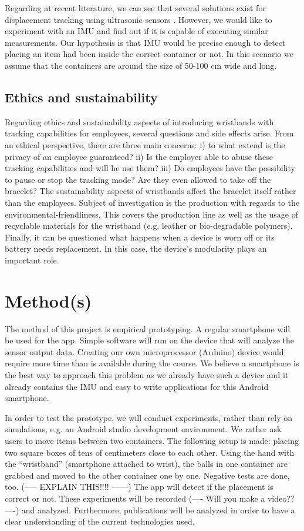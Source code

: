 \documentclass[12pt,twoside, hidelinks]{article}
\begin{document}
Regarding at recent literature, we can see that several solutions exist for displacement tracking using ultrasonic sensors \cite{QiYongbin2014Awwu}. However, we would like to experiment with an IMU and find out if it is capable of executing similar measurements. 
Our hypothesis is that IMU would be precise enough to detect placing an item had been inside the correct container or not. In this scenario we assume that the containers are around the size of 50-100 cm wide and long.

\subsection{Ethics and sustainability}
\label{sect:ethics}

Regarding ethics and sustainability aspects of introducing wristbands with tracking capabilities for employees, several questions and side effects arise. From an ethical perspective, there are three main concerns: i) to what extend is the privacy of an employee guaranteed? ii) Is the employer able to abuse these tracking capabilities and will he use them? iii) Do employees have the possibility to pause or stop the tracking mode? Are they even allowed to take off the bracelet?
The sustainability aspects of wristbands affect the bracelet itself rather than the employees. Subject of investigation is the production with regards to the environmental-friendliness. This covers the production line as well as the usage of recyclable materials for the wristband (e.g. leather or bio-degradable polymers). Finally, it can be questioned what happens when a device is worn off or its battery needs replacement. In this case, the device's modularity plays an important role.

\section{Method(s)}
\label{sec:method}


The method of this project is empirical prototyping. A regular smartphone will be used for the app. Simple software will run on the device that will analyze the sensor output data. Creating our own microprocessor (Arduino) device would require more time than is available during the course. We believe a smartphone is the best way to approach this problem as we already have such a device and it already contains the IMU and easy to write applications for this Android smartphone.

In order to test the prototype, we will conduct experiments, rather than rely on simulations, e.g. an Android studio development environment. We rather ask users to move items between two containers. The following setup is made: placing two square boxes of tens of centimeters close to each other. Using the hand with the “wristband” (smartphone attached to wrist), the balls in one container are grabbed and moved to the other container one by one. Negative tests are done, too. (----- EXPLAIN THIS!!!! ------) The app will detect if the placement is correct or not. These experiments will be recorded (---- Will you make a video?? ----) and analyzed.
Furthermore, publications will be analyzed in order to have a clear understanding of the current technologies used.
\end{document}
